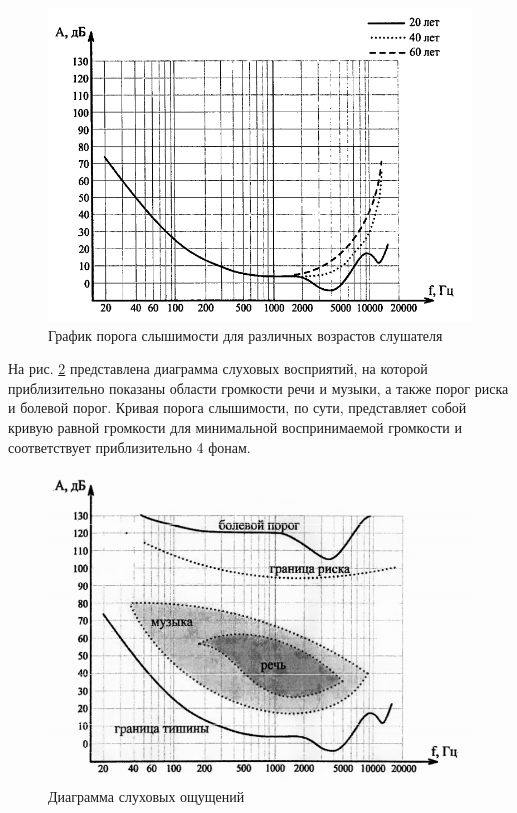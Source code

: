 \documentclass[oneside, final, 14pt]{extreport}
\begin{document}
\begin{figure}[h]
\centering
\includegraphics[scale=0.8]{pic-ear-10}
\caption{График порога слышимости для различных возрастов слушателя}
\label{pic-ear-10}
\end{figure}

На рис. \ref{pic-ear-11} представлена диаграмма слуховых восприятий, на которой приблизительно показаны области громкости речи и музыки, а также порог риска и болевой порог. Кривая порога слышимости, по сути, представляет собой кривую равной громкости для минимальной воспринимаемой громкости и соответствует приблизительно 4 фонам.

\begin{figure}[h]
\centering
\includegraphics[scale=0.8]{pic-ear-11}
\caption{Диаграмма слуховых ощущений}
\label{pic-ear-11}
\end{figure}
\end{document}
